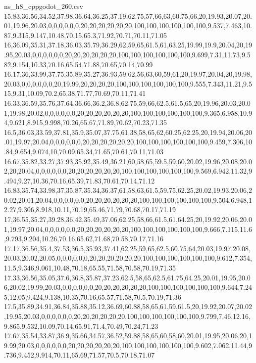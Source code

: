 \begin{filecontents*}[overwrite]{ns_h8_cppgodot_260.csv}
15.83,36.56,34.52,37.98,36.64,36.25,37.19,62.75,57,66,63,60.75,66,20,19.93,20.07,20.01,19.96,20.03,0,0,0,0,0,0,20,20,20,20,20,20,100,100,100,100,100,100,9.537,7.463,10.87,9.315,9.147,10.48,70.15,65.3,71.92,70.71,70.11,71.05
16,36.09,35.31,37.18,36.03,35.79,36.29,62,59,65,61.5,61,63.25,19.99,19.9,20.04,20,19.95,20.03,0,0,0,0,0,0,20,20,20,20,20,20,100,100,100,100,100,100,9.699,7.31,11.73,9.582,9.154,10.33,70.16,65.54,71.88,70.65,70.14,70.99
16.17,36,33.99,37.75,35.89,35.27,36.93,59.62,56,63,60,59,61,20,19.97,20.04,20,19.98,20.03,0,0,0,0,0,0,20,19.99,20,20,20,20,100,100,100,100,100,100,9.555,7.343,11.21,9.515,9.31,10.09,70.2,65.38,71.77,70.69,70.11,71.41
16.33,36.59,35.76,37.64,36.66,36.2,36.8,62.75,59,66,62.5,61.5,65,20,19.96,20.03,20.01,19.98,20.02,0,0,0,0,0,0,20,20,20,20,20,20,100,100,100,100,100,100,9.365,6.958,10.94,9.621,8.915,9.998,70.26,65.67,71.89,70.62,70.23,71.35
16.5,36.03,33.59,37.81,35.9,35.07,37.75,61.38,58,65,62,60.25,62.25,20,19.94,20.06,20.01,19.97,20.04,0,0,0,0,0,0,20,20,20,20,20,20,100,100,100,100,100,100,9.459,7.306,10.84,9.654,9.074,10,70.09,65.34,71.65,70.61,70.11,71.03
16.67,35.82,33.27,37.93,35.92,35.49,36.21,60,58,65,59.5,59,60,20.02,19.96,20.08,20.02,20,20.04,0,0,0,0,0,0,20,20,20,20,20,20,100,100,100,100,100,100,9.569,6.942,11.32,9.494,9.27,10.36,70.16,65.39,71.83,70.61,70.14,71.12
16.83,35.74,33.98,37,35.87,35.34,36.37,61,58,63,61.5,59.75,62.25,20.02,19.93,20.06,20.02,20.01,20.04,0,0,0,0,0,0,20,20,20,20,20,20,100,100,100,100,100,100,9.504,6.948,12.27,9.306,8.918,10.11,70.19,65.46,71.79,70.68,70.17,71.19
17,36.55,35.27,39.28,36.42,35.49,37.06,62.25,58,66,61.5,61,64.25,20,19.92,20.06,20.01,19.97,20.04,0,0,0,0,0,0,20,20,20,20,20,20,100,100,100,100,100,100,9.666,7.115,11.6,9.793,9.204,10.26,70.16,65.62,71.68,70.58,70.17,71.16
17.17,36.56,35.4,37.53,36.5,35.93,37.41,62.25,59,65,62.5,60.75,64,20.03,19.97,20.08,20.03,20.02,20.05,0,0,0,0,0,0,20,20,20,20,20,20,100,100,100,100,100,100,9.612,7.354,11.5,9.346,9.061,10.48,70.18,65.55,71.58,70.58,70.19,71.35
17.33,36.56,35.05,37.6,36.8,35.87,37.23,62.5,58,65,62.5,61.75,64.25,20.01,19.95,20.06,20.02,19.99,20.03,0,0,0,0,0,0,20,20,20,20,20,20,100,100,100,100,100,100,9.644,7.245,12.05,9.424,9.138,10.35,70.16,65.57,71.58,70.5,70.19,71.36
17.5,35.89,34.91,36.84,35.88,35.12,36.69,60.88,58,65,61,59,61.5,20,19.92,20.07,20.02,19.95,20.03,0,0,0,0,0,0,20,20,20,20,20,20,100,100,100,100,100,100,9.799,7.46,12.16,9.865,9.532,10.09,70.14,65.91,71.4,70.49,70.24,71.23
17.67,35.54,33.87,36.9,35.66,34.57,36.52,59.88,58,65,60,58,60,20.01,19.95,20.06,20,19.99,20.03,0,0,0,0,0,0,20,20,20,20,20,20,100,100,100,100,100,100,9.602,7.062,11.44,9.736,9.452,9.914,70.11,65.69,71.57,70.5,70.18,71.07

\end{filecontents*}
